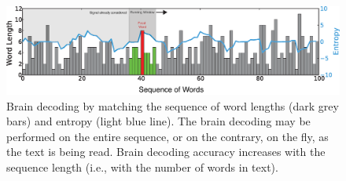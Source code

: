 \documentclass[10pt]{article}
\begin{document}
\begin{figure}[H]
\centering
\includegraphics[width=17cm]{Figures/lWordsEntropyTimeline.eps}
\caption{Brain decoding by matching the sequence of word lengths (dark grey bars) and entropy (light blue line). The brain decoding may be performed on the entire sequence, or on the contrary, on the fly, as the text is being read. Brain decoding accuracy increases with the sequence length (i.e., with the number of words in text).}
\label{fig:sequence_decoding}
\end{figure}


%



\end{document}
